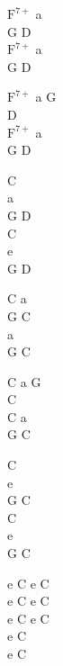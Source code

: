 \begin{chord}
    $\mathrm{F^{7+}}$ a\\
    G D\\
    $\mathrm{F^{7+}}$ a\\
    G D

    $\mathrm{F^{7+}}$ a G\\
    D\\
    $\mathrm{F^{7+}}$ a\\
    G D

    C\\
    a\\
    G D\\
    C\\
    e\\
    G D

    C a\\
    G C\\
    a\\
    G C

    C a G\\
    C\\
    C a\\
    G C

    C\\
    e\\
    G C\\
    C\\
    e\\
    G C

    e C e C\\
    e C e C\\
    e C e C\\
    e C\\
    e C
\end{chord}
